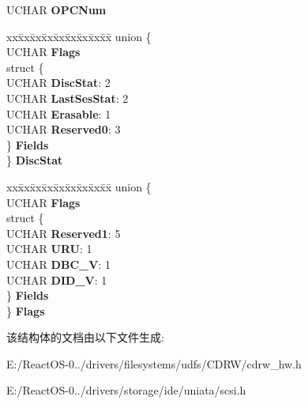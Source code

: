 \begin{DoxyCompactItemize}
U\+C\+H\+AR {\bfseries O\+P\+C\+Num}
\item 
\mbox{\label{struct___d_i_s_c___i_n_f_o___b_l_o_c_k_ac12e0c734b93b1e06f4814240c9de539}} 
\begin{tabbing}
xx\=xx\=xx\=xx\=xx\=xx\=xx\=xx\=xx\=\kill
union \{\\
\>UCHAR {\bfseries Flags}\\
\>struct \{\\
\>\>UCHAR {\bfseries DiscStat}: 2\\
\>\>UCHAR {\bfseries LastSesStat}: 2\\
\>\>UCHAR {\bfseries Erasable}: 1\\
\>\>UCHAR {\bfseries Reserved0}: 3\\
\>\} {\bfseries Fields}\\
\} {\bfseries DiscStat}\\

\end{tabbing}\item 
\mbox{\label{struct___d_i_s_c___i_n_f_o___b_l_o_c_k_aef08539d4a75c0648a75f75d085ed528}} 
\begin{tabbing}
xx\=xx\=xx\=xx\=xx\=xx\=xx\=xx\=xx\=\kill
union \{\\
\>UCHAR {\bfseries Flags}\\
\>struct \{\\
\>\>UCHAR {\bfseries Reserved1}: 5\\
\>\>UCHAR {\bfseries URU}: 1\\
\>\>UCHAR {\bfseries DBC\_V}: 1\\
\>\>UCHAR {\bfseries DID\_V}: 1\\
\>\} {\bfseries Fields}\\
\} {\bfseries Flags}\\

\end{tabbing}\end{DoxyCompactItemize}


该结构体的文档由以下文件生成\+:\begin{DoxyCompactItemize}
\item 
E\+:/\+React\+O\+S-\/0../drivers/filesystems/udfs/\+C\+D\+R\+W/cdrw\+\_\+hw.\+h\item 
E\+:/\+React\+O\+S-\/0../drivers/storage/ide/uniata/scsi.\+h\end{DoxyCompactItemize}
